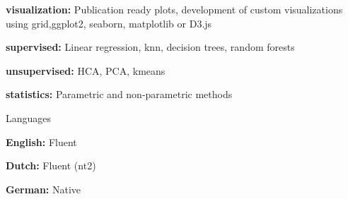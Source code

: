 \begin{cvskills}
{\begin{cvitems}
        \item {\textbf{visualization:} Publication ready plots, development of custom visualizations using grid,\newline ggplot2, seaborn, matplotlib or D3.js}
        \item {\textbf{supervised:} Linear regression, knn, decision trees, random forests}
        \item {\textbf{unsupervised:} HCA, PCA, kmeans}
        \item {\textbf{statistics:} Parametric and non-parametric methods}
      \end{cvitems}
    }
  \cvskill
    {Languages} %
    {
      \begin{cvitems}
        \item {\textbf{English:} Fluent}
        \item {\textbf{Dutch:} Fluent (nt2)}
        \item {\textbf{German:} Native}
      \end{cvitems}
    }
\end{cvskills}
